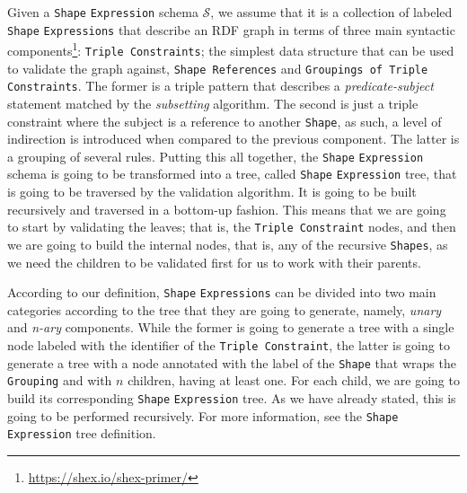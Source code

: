 Given a \texttt{Shape} \texttt{Expression} schema $\mathcal{S}$, we assume that it is a collection of labeled \texttt{Shape} \texttt{Expressions} that describe an RDF graph in terms of three main syntactic components\footnote{\url{https://shex.io/shex-primer/}}: \texttt{Triple Constraints}; the simplest data structure that can be used to validate the graph against, \texttt{Shape References} and \texttt{Groupings of Triple Constraints}. The former is a triple pattern that describes a \textit{predicate-subject} statement matched by the \textit{subsetting} algorithm. The second is just a triple constraint where the subject is a reference to another \texttt{Shape}, as such, a level of indirection is introduced when compared to the previous component. The latter is a grouping of several rules. Putting this all together, the \texttt{Shape} \texttt{Expression} schema is going to be transformed into a tree, called \texttt{Shape} \texttt{Expression} tree, that is going to be traversed by the validation algorithm. It is going to be built recursively and traversed in a bottom-up fashion. This means that we are going to start by validating the leaves; that is, the \texttt{Triple Constraint} nodes, and then we are going to build the internal nodes, that is, any of the recursive \texttt{Shapes}, as we need the children to be validated first for us to work with their parents.

According to our definition, \texttt{Shape} \texttt{Expressions} can be divided into two main categories according to the tree that they are going to generate, namely, \textit{unary} and \textit{n-ary} components. While the former is going to generate a tree with a single node labeled with the identifier of the \texttt{Triple Constraint}, the latter is going to generate a tree with a node annotated with the label of the \texttt{Shape} that wraps the \texttt{Grouping} and with $n$ children, having at least one. For each child, we are going to build its corresponding \texttt{Shape} \texttt{Expression} tree. As we have already stated, this is going to be performed recursively. For more information, see the \texttt{Shape} \texttt{Expression} tree definition.

\vspace*{0.5em}

